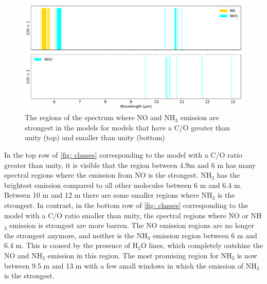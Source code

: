 \documentclass[oneside, single, authoryear, semicolon, 12pt]{lion-msc}
\newcommand{\4}{$_4$}
\newcommand{\3}{$_3$}
\newcommand{\2}{$_2$}
\begin{document}


\begin{figure}[H]
    \centering
    \includegraphics[width=\linewidth]{Figures/ClassificationCO.pdf}
    \caption{The regions of the spectrum where NO and NH\3 emission are strongest in the models for models that have a C/O greater than unity (top) and smaller than unity (bottom)}
    \label{fig: classes}
\end{figure}

In the top row of \autoref{fig: classes} corresponding to the model with a C/O ratio greater than unity, it is visible that the region between 4.9\textmu m and 6 \textmu m has many spectral regions where the emission from NO is the strongest. NH\3 has the brightest emission compared to all other molecules between 6 \textmu m and 6.4 \textmu m. Between 10 \textmu m and 12 \textmu m there are some smaller regions where NH\3 is the strongest. In contrast, in the bottom row of \autoref{fig: classes} corresponding to the model with a C/O ratio smaller than unity, the spectral regions where NO or NH\3 emission is strongest are more barren. The NO emission regions are no longer the strongest anymore, and neither is the NH\3 emission region between 6 \textmu m and 6.4 \textmu m. This is caused by the presence of H\2O lines, which completely outshine the NO and NH\3 emission in this region. The most promising region for NH\3 is now between 9.5 \textmu m and 13 \textmu m with a few small windows in which the emission of NH\3 is the strongest.
\end{document}

